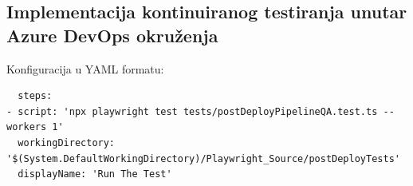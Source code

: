 \subsection*{Implementacija kontinuiranog testiranja unutar Azure DevOps okruženja}

Konfiguracija u YAML formatu:
\begin{verbatim}
  steps:
- script: 'npx playwright test tests/postDeployPipelineQA.test.ts --workers 1'
  workingDirectory: '$(System.DefaultWorkingDirectory)/Playwright_Source/postDeployTests'
  displayName: 'Run The Test'
\end{verbatim}